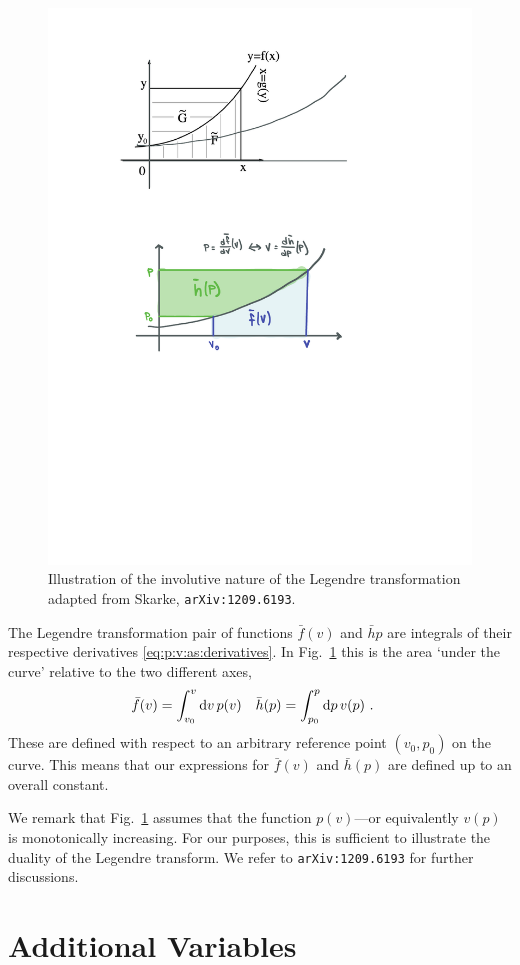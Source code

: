 \begin{figure}[tb]
    \centering
    \includegraphics[width=.7\linewidth]{figures/LegendreArea.pdf}
    \caption{Illustration of the involutive nature of the Legendre transformation adapted from Skarke, \texttt{arXiv:1209.6193}. }
    \label{fig:Legendre:area}
\end{figure}

The Legendre transformation pair of functions $\bar f(v)$ and $\bar h{p}$ are integrals of their respective derivatives \eqref{eq:p:v:as:derivatives}. In Fig.~\ref{fig:Legendre:area} this is the area `under the curve' relative to the two different axes, 
\begin{align}
    \bar f(v) &= \int^v_{v_0} \operatorname{d}\mkern-3mu^{}\mkern-1mu{v}\, p(v)
    &
    \bar h(p) &= \int^p_{p_0} \operatorname{d}\mkern-3mu^{}\mkern-1mu{p}\, v(p) \ .
\end{align}
These are defined with respect to an arbitrary reference point $(v_0, p_0)$ on the curve. This means that our expressions for $\bar f(v)$ and $\bar h(p)$ are defined up to an overall constant. 

We remark that Fig.~\ref{fig:Legendre:area} assumes that the function $p(v)$---or equivalently $v(p)$ is monotonically increasing. For our purposes, this is sufficient to illustrate the duality of the Legendre transform. We refer to \texttt{arXiv:1209.6193} for further discussions.

\section{Additional Variables}

